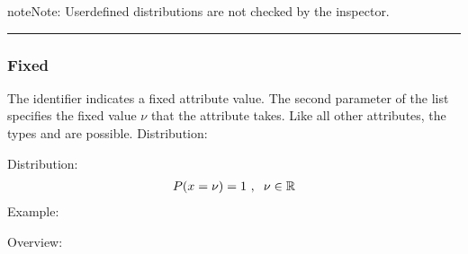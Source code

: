 \documentclass[letterpaper,10pt,english]{sphinxmanual}
\begin{document}

\begin{sphinxadmonition}{note}{Note:}
\sphinxAtStartPar
User\sphinxhyphen{}defined distributions are not checked by the inspector.
\end{sphinxadmonition}


\bigskip\hrule\bigskip



\subsubsection{Fixed}
\label{\detokenize{source/Interface_files/attribute_values:fixed}}\label{\detokenize{source/Interface_files/attribute_values:fix}}
\sphinxAtStartPar
The identifier  indicates a fixed attribute value. The second parameter of the list specifies the fixed value
\(\nu\) that the attribute takes. Like all other attributes, the types  and  are possible. Distribution:

\sphinxAtStartPar
Distribution:
\begin{equation*}
\begin{split}P(x=\nu)=1\ ,\hspace{0.2cm} \nu\in\mathbb{R}\end{split}
\end{equation*}
\sphinxAtStartPar
Example:

\begin{sphinxVerbatim}[commandchars=\\\{\}]
 \PYG{p}{[}\PYG{p}{]}
\end{sphinxVerbatim}


\sphinxAtStartPar
Overview:
\end{document}
